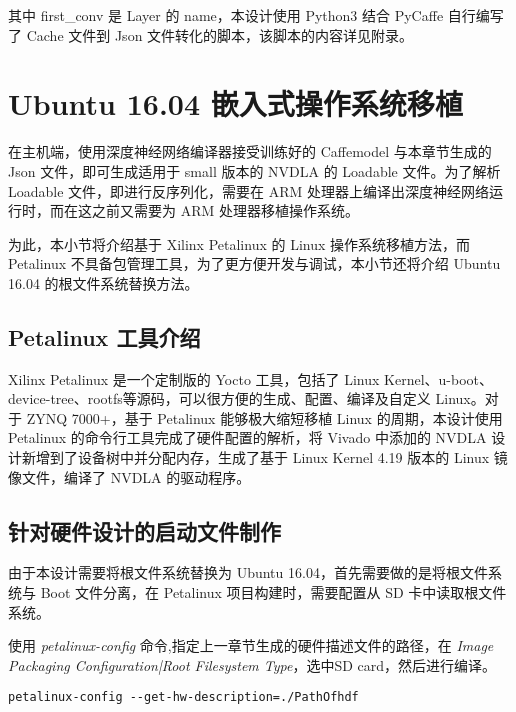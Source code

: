 其中 first\_conv 是 Layer 的 name，本设计使用 Python3 结合 PyCaffe 自行编写了 Cache 文件到 Json 文件转化的脚本，该脚本的内容详见附录。

 
\section{Ubuntu 16.04 嵌入式操作系统移植}

在主机端，使用深度神经网络编译器接受训练好的 Caffemodel 与本章节生成的 Json 文件，即可生成适用于 small 版本的 NVDLA 的 Loadable 文件。为了解析 Loadable 文件，即进行反序列化，需要在 ARM 处理器上编译出深度神经网络运行时，而在这之前又需要为 ARM 处理器移植操作系统。

为此，本小节将介绍基于 Xilinx Petalinux 的 Linux 操作系统移植方法，而 Petalinux 不具备包管理工具，为了更方便开发与调试，本小节还将介绍 Ubuntu 16.04 的根文件系统替换方法。

\subsection{Petalinux 工具介绍}

Xilinx Petalinux 是一个定制版的 Yocto 工具，包括了 Linux Kernel、u-boot、device-tree、rootfs等源码，可以很方便的生成、配置、编译及自定义 Linux。对于 ZYNQ 7000+，基于 Petalinux 能够极大缩短移植 Linux 的周期，本设计使用 Petalinux 的命令行工具完成了硬件配置的解析，将 Vivado 中添加的 NVDLA 设计新增到了设备树中并分配内存，生成了基于 Linux Kernel 4.19 版本的 Linux 镜像文件，编译了 NVDLA 的驱动程序。

\subsection{针对硬件设计的启动文件制作}

由于本设计需要将根文件系统替换为 Ubuntu 16.04，首先需要做的是将根文件系统与 Boot 文件分离，在 Petalinux 项目构建时，需要配置从 SD 卡中读取根文件系统。

使用 \emph{petalinux-config} 命令,指定上一章节生成的硬件描述文件的路径，在 \emph{Image Packaging Configuration|Root Filesystem Type}，选中SD card，然后进行编译。

\begin{lstlisting}
petalinux-config --get-hw-description=./PathOfhdf
\end{lstlisting}

